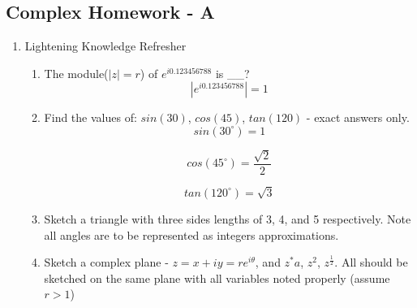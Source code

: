 \documentclass[12pt]{article}
\begin{document}
\subsection{Complex Homework - A}
\begin{enumerate}

	\item Lightening Knowledge Refresher
		\begin{enumerate}

		\item The module($|z| = r$) of $e^{i0.123456788}$ is \_\_?
			\begin{equation*}
				    |e^{i0.123456788}| = 1
			\end{equation*}
		\item Find the values of: $sin(30)$, $cos(45)$, $tan(120)$ - exact answers only.
		\begin{equation*}
			sin(30^{\circ}) = 1
		\end{equation*}	

		\begin{equation*}
			cos(45^{\circ}) = \frac{\sqrt{2}}{2}	
		\end{equation*}	

		\begin{equation*}
			tan(120^{\circ}) = \sqrt{3}
		\end{equation*}	


		\item Sketch a triangle with three sides lengths of 3, 4, and 5 respectively. Note all angles are to be represented as integers approximations. 
			
		\item Sketch a complex plane - $z=x+iy=re^{i\theta}$, and $z^{*}a$, $z^{2}$, $z^{\frac{1}{2}}$. All should be sketched on the same plane with all variables noted properly (assume $r > 1$)

\begin{center}
\end{center}
\end{enumerate}
\end{enumerate}
\end{document}
